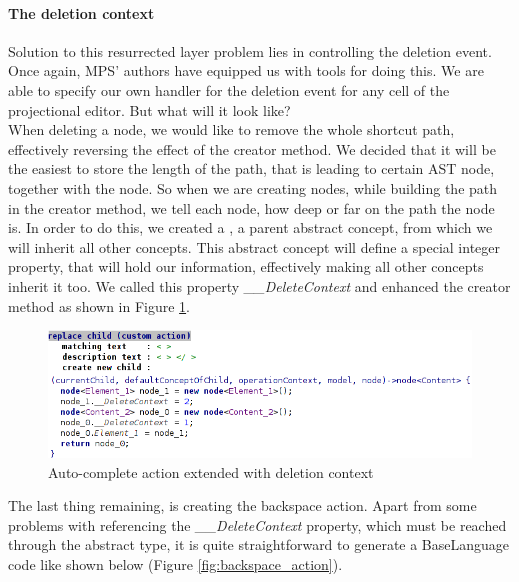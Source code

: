 \paragraph {The deletion context}

Solution to this resurrected layer problem lies in controlling the deletion event.
Once again, MPS' authors have equipped us with tools for doing this.
We are able to specify our own handler for the deletion event for any cell of the projectional editor.
But what will it look like?
\\

When deleting a node, we would like to remove the whole shortcut path, effectively reversing the effect of the creator method.
We decided that it will be the easiest to store the length of the path, that is leading to certain AST node, together with the node.
So when we are creating nodes, while building the path in the creator method, we tell each node, how deep or far on the path the node is.
In order to do this, we created a , a parent abstract concept, from which we will inherit all other concepts.
This abstract concept will define a special integer property, that will hold our information, effectively making all other concepts inherit it too.
We called this property \textit{{\_}{\_}DeleteContext} and enhanced the creator method as shown in Figure \ref{fig:autocomplete_action_delete_context}.

\begin{figure}[h]
	\centering
	\includegraphics[width=\textwidth]{./img/autocomplete_action_delete_context.png}
	\caption{Auto-complete action extended with deletion context}
	\label{fig:autocomplete_action_delete_context}
\end{figure}

The last thing remaining, is creating the backspace action.
Apart from some problems with referencing the \textit{{\_}{\_}DeleteContext} property, which must be reached through the abstract  type, it is quite straightforward to generate a BaseLanguage code like shown below (Figure \ref{fig:backspace_action}).

